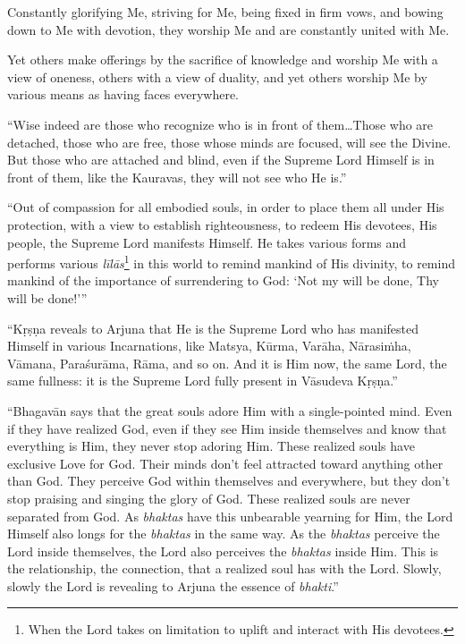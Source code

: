 {Constantly glorifying Me, striving for Me, being fixed in firm vows, and bowing down to Me with devotion, they worship Me and are constantly united with Me.}

{Yet others make offerings by the sacrifice of knowledge and worship Me with a view of oneness, others with a view of duality, and yet others worship Me by various means as having faces everywhere.}

\enquote{Wise indeed are those who recognize who is in front of them\ldots Those who are detached, those who are free, those whose minds are focused, will see the Divine. But those who are attached and blind, even if the Supreme Lord Himself is in front of them, like the Kauravas, they will not see who He is.}

\enquote{Out of compassion for all embodied souls, in order to place them all under His protection, with a view to establish righteousness, to redeem His devotees, His people, the Supreme Lord manifests Himself. He takes various forms and performs various \textit{līlās}\footnote{When the Lord takes on limitation to uplift and interact with His devotees.} in this world to remind mankind of His divinity, to remind mankind of the importance of surrendering to God: \enquote{Not my will be done, Thy will be done!}}

\enquote{Kṛṣṇa reveals to Arjuna that He is the Supreme Lord who has manifested Himself in various Incarnations, like Matsya, Kūrma, Varāha, Nārasiṁha, Vāmana, Paraśurāma, Rāma, and so on. And it is Him now, the same Lord, the same fullness: it is the Supreme Lord fully present in Vāsudeva Kṛṣṇa.}

\enquote{Bhagavān says that the great souls adore Him with a single-pointed mind. Even if they have realized God, even if they see Him inside themselves and know that everything is Him, they never stop adoring Him. These realized souls have exclusive Love for God. Their minds don’t feel attracted toward anything other than God. They perceive God within themselves and everywhere, but they don’t stop praising and singing the glory of God. These realized souls are never separated from God. As \textit{bhaktas} have this unbearable yearning for Him, the Lord Himself also longs for the \textit{bhaktas} in the same way. As the \textit{bhaktas} perceive the Lord inside themselves, the Lord also perceives the \textit{bhaktas} inside Him. This is the relationship, the connection, that a realized soul has with the Lord. Slowly, slowly the Lord is revealing to Arjuna the essence of \textit{bhakti}.}

